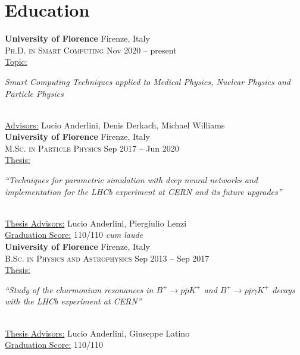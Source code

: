 \newcommand{\university}[2]
  {\large \textbf{\color{hlcolor-0} #1} \hfill {\color{hlcolor-2} #2}}
  
\newcommand{\degree}[2]
  {\small \color{hlcolor-1} 
  {\color{iconcolor} \faGraduationCap}
  \textsc{#1} \hfill {#2}}
  
\newcommand{\worktitle}[2]
  {\normalsize \color{maincolor}
    \ul{#1:}
    \begin{minipage}[t]{0.75\linewidth}
      \begin{flushleft}
        \emph{#2}
      \end{flushleft}
    \end{minipage}}


\section*{Education}
\begin{cvcontent}
  \university{University of Florence}{Firenze, Italy}\\
  \degree{Ph.D. in Smart Computing}{Nov 2020 -- present}\\ [1mm]
  \worktitle{Topic}{Smart Computing Techniques applied to Medical
  Physics, Nuclear Physics and Particle Physics}\\ [1.5mm]
  \ul{Advisors:} Lucio Anderlini, Denis Derkach, Michael Williams 
  \\ [4mm]
  \university{University of Florence}{Firenze, Italy}\\
  \degree{M.Sc. in Particle Physics}{Sep 2017 -- Jun 2020}\\ [1mm]
  \worktitle{Thesis}{``Techniques for parametric simulation with deep neural networks and implementation for the LHCb experiment at CERN
  and its future upgrades''}\\ [1.5mm]
  \ul{Thesis Advisors:} Lucio Anderlini, Piergiulio Lenzi\\ [0.5mm]
  \ul{Graduation Score:} 110/110 \emph{cum laude}
  \\ [4mm]
  \university{University of Florence}{Firenze, Italy}\\
  \degree{B.Sc. in Physics and Astrophysics}{Sep 2013 -- Sep 2017}\\ [1mm]
  \worktitle{Thesis}{``Study of the charmonium resonances in 
      $B^+ \to p \bar{p} K^+$ and $B^+ \to p \bar{p} \gamma K^+$
      decays with the LHCb experiment at CERN''}\\ [1.5mm]
  \ul{Thesis Advisors:} Lucio Anderlini, Giuseppe Latino\\ [0.5mm]
  \ul{Graduation Score:} 110/110
\end{cvcontent}